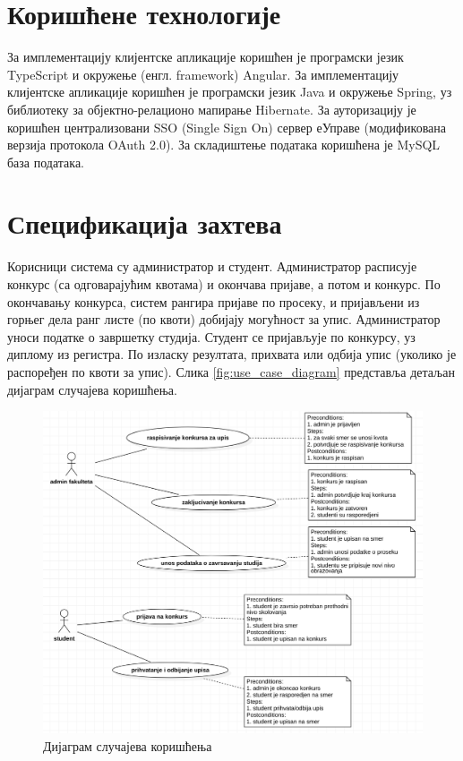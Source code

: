 \documentclass[a4paper]{article}
\begin{document}
\section*{Коришћене технологије}

За имплементацију клијентске апликације коришћен је програмски језик TypeScript\cite{typescript} и окружење (енгл. framework) Angular\cite{angular}.
За имплементацију клијентске апликације коришћен је програмски језик Java\cite{java} и окружење Spring\cite{spring}, уз библиотеку за објектно-релационо мапирање Hibernate\cite{hibernate}.
За ауторизацију је коришћен централизовани SSO (Single Sign On) сервер еУправе (модификована верзија протокола OAuth 2.0).
За складиштење података коришћена је MySQL\cite{mysql} база података.

\section*{Спецификација захтева}

Корисници система су администратор и студент. Администратор расписује конкурс (са одговарајућим квотама) и окончава пријаве,
а потом и конкурс. По окончавању конкурса, систем рангира пријаве по просеку, и пријављени из горњег дела ранг листе
(по квоти) добијају могућност за упис. Администратор уноси податке о завршетку студија. Студент се пријављује по конкурсу, уз диплому из регистра. По изласку резултата, прихвата или одбија упис (уколико је распоређен по квоти за упис). Слика \autoref{fig:use_case_diagram} представља детаљан дијаграм случајева коришћења.

\begin{figure}[H]
    \centering
    \includegraphics{images/use_case_diagram.png}
    \caption{Дијаграм случајева коришћења}
    \label{fig:use_case_diagram}
\end{figure}
\end{document}
